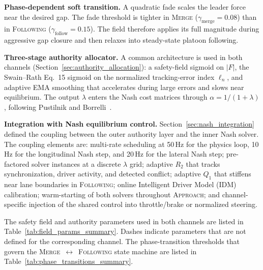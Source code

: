 \documentclass[12pt,a4paper,oneside]{report}
\begin{document}
\textbf{Phase-dependent soft transition.} A quadratic fade scales the leader force near the desired gap. The fade threshold is tighter in \textsc{Merge} ($\gamma_{\mathrm{merge}} = 0.08$) than in \textsc{Following} ($\gamma_{\mathrm{follow}} = 0.15$). The field therefore applies its full magnitude during aggressive gap closure and then relaxes into steady-state platoon following.

\textbf{Three-stage authority allocator.} A common architecture is used in both channels (Section~\ref{sec:authority_allocation}): a safety-field sigmoid on $|F|$, the Swain--Rath Eq.~15 sigmoid on the normalized tracking-error index $\ell_n$, and adaptive EMA smoothing that accelerates during large errors and slows near equilibrium. The output $\lambda$ enters the Nash cost matrices through $\alpha = 1/(1+\lambda)$, following Pustilnik and Borrelli~\cite{pustilnikGeneralizedNashEquilibrium2025}.

\textbf{Integration with Nash equilibrium control.} Section~\ref{sec:nash_integration} defined the coupling between the outer authority layer and the inner Nash solver. The coupling elements are: multi-rate scheduling at 50\,Hz for the physics loop, 10\,Hz for the longitudinal Nash step, and 20\,Hz for the lateral Nash step; pre-factored solver instances at a discrete $\lambda$ grid; adaptive $R_2$ that tracks synchronization, driver activity, and detected conflict; adaptive $Q_1$ that stiffens near lane boundaries in \textsc{Following}; online Intelligent Driver Model (IDM) calibration; warm-starting of both solvers throughout \textsc{Approach}; and channel-specific injection of the shared control into throttle/brake or normalized steering.

The safety field and authority parameters used in both channels are listed in Table~\ref{tab:field_params_summary}. Dashes indicate parameters that are not defined for the corresponding channel. The phase-transition thresholds that govern the \textsc{Merge}~$\leftrightarrow$~\textsc{Following} state machine are listed in Table~\ref{tab:phase_transitions_summary}.
\end{document}
